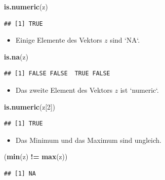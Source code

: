 \documentclass[12pt,a4paper]{article}
\newenvironment{Shaded}{\begin{snugshade}}{\end{snugshade}}
\newcommand{\DecValTok}[1]{\textcolor[rgb]{0.00,0.00,0.81}{#1}}
\newcommand{\FunctionTok}[1]{\textcolor[rgb]{0.13,0.29,0.53}{\textbf{#1}}}
\newcommand{\NormalTok}[1]{#1}
\newcommand{\SpecialCharTok}[1]{\textcolor[rgb]{0.81,0.36,0.00}{\textbf{#1}}}
\begin{document}
\begin{Shaded}
\begin{Highlighting}[]
    \FunctionTok{is.numeric}\NormalTok{(z)}
\end{Highlighting}
\end{Shaded}

\begin{verbatim}
## [1] TRUE
\end{verbatim}

\begin{itemize}
  \item Einige Elemente des Vektors $z$ sind `NA`. 
\end{itemize}

\begin{Shaded}
\begin{Highlighting}[]
    \FunctionTok{is.na}\NormalTok{(z)}
\end{Highlighting}
\end{Shaded}

\begin{verbatim}
## [1] FALSE FALSE  TRUE FALSE
\end{verbatim}

\begin{itemize}
  \item Das zweite Element des Vektors $z$ ist `numeric`.
\end{itemize}

\begin{Shaded}
\begin{Highlighting}[]
    \FunctionTok{is.numeric}\NormalTok{(z[}\DecValTok{2}\NormalTok{])}
\end{Highlighting}
\end{Shaded}

\begin{verbatim}
## [1] TRUE
\end{verbatim}

\begin{itemize}
  \item Das Minimum und das Maximum sind ungleich. 
\end{itemize}

\begin{Shaded}
\begin{Highlighting}[]
\NormalTok{    (}\FunctionTok{min}\NormalTok{(z) }\SpecialCharTok{!=} \FunctionTok{max}\NormalTok{(z))}
\end{Highlighting}
\end{Shaded}

\begin{verbatim}
## [1] NA
\end{verbatim}
\end{document}
